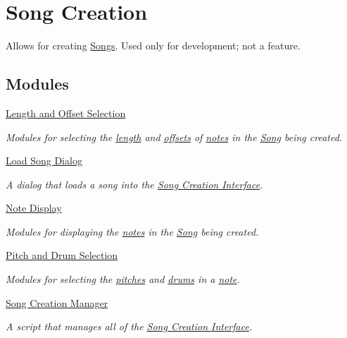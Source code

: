 \hypertarget{group___doc_s_c}{}\section{Song Creation}
\label{group___doc_s_c}


Allows for creating \hyperlink{class_song}{Songs}. Used only for development; not a feature.  


\subsection*{Modules}
\begin{DoxyCompactItemize}
\item 
\hyperlink{group___doc_s_c___l_o_s}{Length and Offset Selection}
\begin{DoxyCompactList}\small\item\em Modules for selecting the \hyperlink{group___music_enums_gaf11b5f079adbb21c800b9eca1c5c3cbd}{length} and \hyperlink{group___music_structs_ae281187907aed4c728c7981300dbebaf}{offsets} of \hyperlink{group___music_structs_struct_music_1_1_combined_note}{notes} in the \hyperlink{class_song}{Song} being created. \end{DoxyCompactList}\item 
\hyperlink{group___doc_s_c___l_s_d}{Load Song Dialog}
\begin{DoxyCompactList}\small\item\em A dialog that loads a song into the \hyperlink{group___doc_s_c}{Song Creation Interface}. \end{DoxyCompactList}\item 
\hyperlink{group___doc_s_c___n_d}{Note Display}
\begin{DoxyCompactList}\small\item\em Modules for displaying the \hyperlink{group___music_structs_struct_music_1_1_combined_note}{notes} in the \hyperlink{class_song}{Song} being created. \end{DoxyCompactList}\item 
\hyperlink{group___doc_s_c___p_d_s}{Pitch and Drum Selection}
\begin{DoxyCompactList}\small\item\em Modules for selecting the \hyperlink{group___music_enums_ga508f69b199ea518f935486c990edac1d}{pitches} and \hyperlink{group___music_enums_gade475b4382c7066d1af13e7c13c029b6}{drums} in a \hyperlink{group___music_structs_struct_music_1_1_combined_note}{note}. \end{DoxyCompactList}\item 
\hyperlink{group___doc_s_c_m}{Song Creation Manager}
\begin{DoxyCompactList}\small\item\em A script that manages all of the \hyperlink{group___doc_s_c}{Song Creation Interface}. \end{DoxyCompactList}\end{DoxyCompactItemize}



